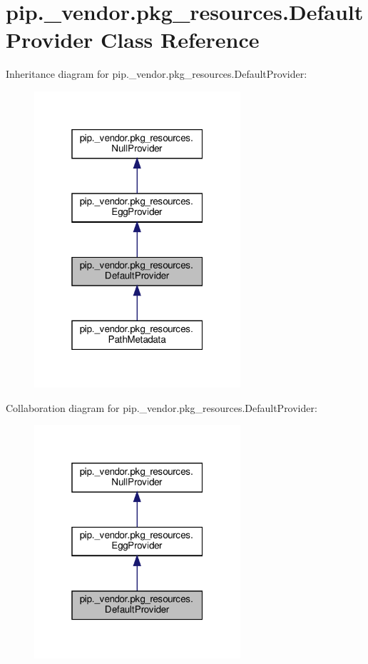 \hypertarget{classpip_1_1__vendor_1_1pkg__resources_1_1DefaultProvider}{}\section{pip.\+\_\+vendor.\+pkg\+\_\+resources.\+Default\+Provider Class Reference}
\label{classpip_1_1__vendor_1_1pkg__resources_1_1DefaultProvider}


Inheritance diagram for pip.\+\_\+vendor.\+pkg\+\_\+resources.\+Default\+Provider\+:
\nopagebreak
\begin{figure}[H]
\begin{center}
\leavevmode
\includegraphics[width=217pt]{classpip_1_1__vendor_1_1pkg__resources_1_1DefaultProvider__inherit__graph}
\end{center}
\end{figure}


Collaboration diagram for pip.\+\_\+vendor.\+pkg\+\_\+resources.\+Default\+Provider\+:
\nopagebreak
\begin{figure}[H]
\begin{center}
\leavevmode
\includegraphics[width=217pt]{classpip_1_1__vendor_1_1pkg__resources_1_1DefaultProvider__coll__graph}
\end{center}
\end{figure}
